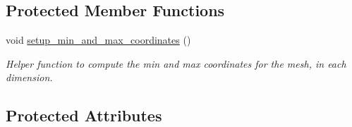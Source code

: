 \subsection*{Protected Member Functions}
\begin{DoxyCompactItemize}
\item 
void \hyperlink{classSamplePointContainer_af69785a39545f46473ccf0d10f61e08b}{setup\+\_\+min\+\_\+and\+\_\+max\+\_\+coordinates} ()
\begin{DoxyCompactList}\small\item\em Helper function to compute the min and max coordinates for the mesh, in each dimension. \end{DoxyCompactList}\end{DoxyCompactItemize}
\subsection*{Protected Attributes}
